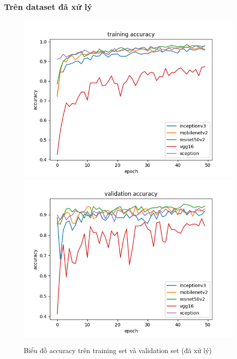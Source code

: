 \documentclass[a4paper,14pt]{extarticle}
\begin{document}
	\subsubsection{Trên dataset đã xử lý}
		\begin{figure}[H]
			\centering
			\includegraphics[scale=0.45]{images/accuracy.png}
			\includegraphics[scale=0.45]{images/val_accuracy.png}
			\caption{Biểu đồ accuracy trên training set và validation set (đã xử lý)}
		\end{figure}
\end{document}
